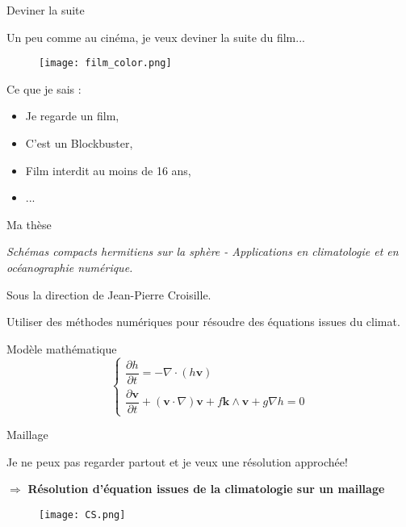 \documentclass[11pt]{beamer}
\begin{document}

\begin{frame}{Deviner la suite}

Un peu comme au cinéma, je veux deviner la suite du film...

\begin{center}
\begin{figure}
\texttt{[image: film\_color.png]}
\end{figure}
\end{center}

Ce que je sais :
\begin{itemize}
\item Je regarde un film, \pause
\item C'est un Blockbuster, \pause
\item Film interdit au moins de 16 ans, \pause
\item ...
\end{itemize}

\end{frame}


\begin{frame}{Ma thèse}
\begin{center}
\textit{Schémas compacts hermitiens sur la sphère - Applications en climatologie et en océanographie numérique.}
\end{center}
Sous la direction de Jean-Pierre Croisille.

Utiliser des méthodes numériques pour résoudre des équations issues du climat.

\begin{block}{Modèle mathématique}
$$
\left\lbrace
\begin{array}{c}
\dfrac{\partial h}{\partial t} = - \nabla \cdot ( h \mathbf{v})\\
\dfrac{\partial \mathbf{v}}{\partial t} + (\mathbf{v} \cdot \nabla) \mathbf{v} + f \mathbf{k} \wedge \mathbf{v} + g \nabla h = 0
\end{array}
\right.
$$
\end{block}
\end{frame}



\begin{frame}{Maillage}

Je ne peux pas regarder partout et je veux une résolution approchée!

$\Rightarrow$ \textbf{Résolution d'équation issues de la climatologie sur un maillage}

\begin{center}
\begin{figure}
\texttt{[image: CS.png]}
\end{figure}
\end{center}

\end{frame}
\end{document}
